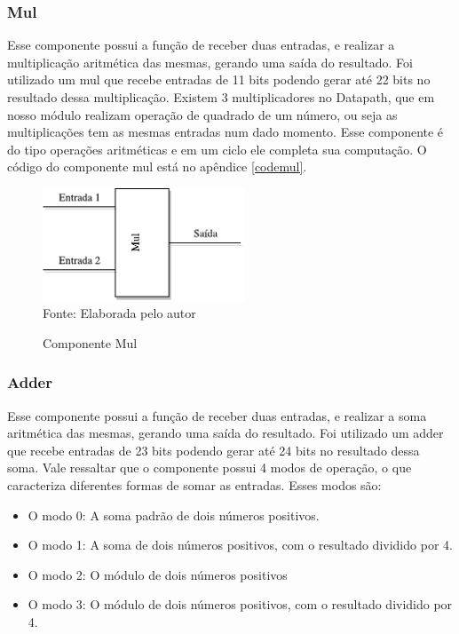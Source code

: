 \subsubsection{Mul}
Esse componente possui a função de receber duas entradas, e realizar a multiplicação aritmética das mesmas, gerando uma saída do resultado. Foi utilizado um mul que recebe entradas de 11 bits podendo gerar até 22 bits no resultado dessa multiplicação. Existem 3 multiplicadores no Datapath, que em nosso módulo realizam operação de quadrado de um número, ou seja as multiplicações tem as mesmas entradas num dado momento. Esse componente é do tipo operações aritméticas e em um ciclo ele completa sua computação. O código do componente mul está no apêndice \ref{codemul}.

\begin{figure}[H]
	\centering
	\caption{Componente Mul}
	\includegraphics[width=6cm]{figures/Mul.pdf}\\
	
{Fonte: Elaborada pelo autor}
	\label{Mul}
\end{figure}



\subsubsection{Adder}
Esse componente possui a função de receber duas entradas, e realizar a soma aritmética das mesmas, gerando uma saída do resultado. Foi utilizado um adder que recebe entradas de 23 bits podendo gerar até 24 bits no resultado dessa soma. Vale ressaltar que o componente possui 4 modos de operação, o que caracteriza diferentes formas de somar as entradas. Esses modos são:
\begin{itemize}
	\item O modo 0: A soma padrão de dois números positivos.
	\item O modo 1: A soma de dois números positivos, com o resultado dividido por 4.
	\item O modo 2: O módulo de dois números positivos
	\item O modo 3: O módulo de dois números positivos, com o resultado dividido por 4.
\end{itemize}

